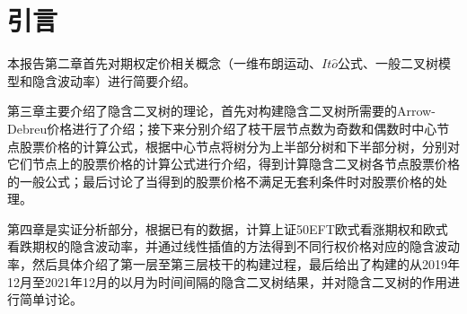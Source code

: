 \chapter{引言}
本报告第二章首先对期权定价相关概念（一维布朗运动、$It\hat{o}$公式、一般二叉树模型和隐含波动率）进行简要介绍。

第三章主要介绍了隐含二叉树的理论，首先对构建隐含二叉树所需要的Arrow-Debreu价格进行了介绍；接下来分别介绍了枝干层节点数为奇数和偶数时中心节点股票价格的计算公式，根据中心节点将树分为上半部分树和下半部分树，分别对它们节点上的股票价格的计算公式进行介绍，得到计算隐含二叉树各节点股票价格的一般公式；最后讨论了当得到的股票价格不满足无套利条件时对股票价格的处理。

第四章是实证分析部分，根据已有的数据，计算上证50EFT欧式看涨期权和欧式看跌期权的隐含波动率，并通过线性插值的方法得到不同行权价格对应的隐含波动率，然后具体介绍了第一层至第三层枝干的构建过程，最后给出了构建的从2019年12月至2021年12月的以月为时间间隔的隐含二叉树结果，并对隐含二叉树的作用进行简单讨论。